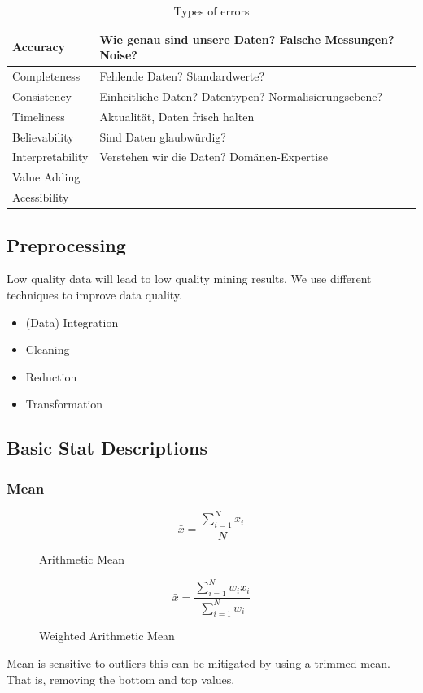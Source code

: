 \documentclass[../Main.tex]{subfiles}
\begin{document}
\begin{table}[H]
    \begin{tabularx}{\columnwidth}{X|X}
        Accuracy & Wie genau sind unsere Daten? Falsche Messungen? Noise? \\
        \hline
        Completeness & Fehlende Daten? Standardwerte? \\
        \hline
        Consistency & Einheitliche Daten? Datentypen? Normalisierungsebene? \\
        \hline
        Timeliness & Aktualität, Daten frisch halten \\
        \hline
        Believability & Sind Daten glaubwürdig? \\
        \hline
        Interpretability & Verstehen wir die Daten? Domänen-Expertise \\
        \hline
        Value Adding & \\
        \hline
        Acessibility & \\
    \end{tabularx}
    \caption{Types of errors}
\end{table}

\subsection{Preprocessing}
Low quality data will lead to low quality mining results.
We use different techniques to improve data quality.
\begin{itemize}
    \item (Data) Integration
    \item Cleaning
    \item Reduction
    \item Transformation
\end{itemize}

\subsection{Basic Stat Descriptions}
\subsubsection{Mean}
\begin{figure}[H]
    \begin{equation}
        \bar{x} = \frac{\sum_{i=1}^{N} x_i}{N}
    \end{equation}
    \caption{Arithmetic Mean}
\end{figure}
\begin{figure}[H]
    \begin{equation}
        \bar{x} = \frac{\sum_{i=1}^{N} w_i x_i}{\sum_{i=1}^{N} w_i}
    \end{equation}
    \caption{Weighted Arithmetic Mean}
\end{figure}
 Mean is sensitive to outliers this can be mitigated by using a trimmed mean.
 That is, removing the bottom and top values.
\end{document}
